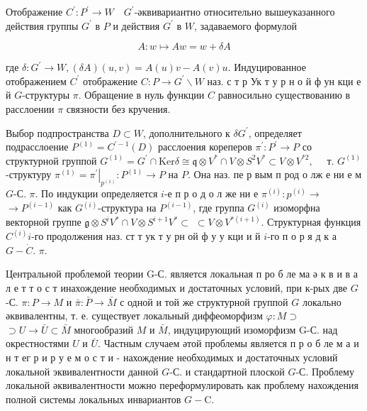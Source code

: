 \documentclass[10pt]{article}
\begin{document}
Отображение $C^{\prime}: P^{\prime} \rightarrow W \quad G^{\prime}$-әквивариантно относительно вышеуказанного действия группы $G^{\prime}$ в $P$ и действия $G^{\prime}$ в $W$, задаваемого формулой



\[

A: w \longmapsto A w=w+\delta A

\]



где $\delta: G^{\prime} \rightarrow W,(\delta A)(u, v)=A(u) v-A(v) u$. Индуцированное отображением $C^{\prime}$ отображение $C: P \rightarrow G^{\prime} \backslash W$ наз. с т р Ук т у р н о й ф ун кци е й $G$-структуры $\pi$. Обращение в нуль функции $C$ равносильно существованию в расслоении $\pi$ связности без кручения.



Выбор подпространства $D \subset W$, дополнительного к $\delta G^{\prime}$, определяет подрасслоение $P^{(1)}=C^{\prime-1}(D)$ расслоения кореперов $\pi^{\prime}: P^{\prime} \rightarrow P$ со структурной группой $G^{(1)}=G^{\prime} \cap \mathrm{Ker} \delta \cong \mathfrak{q} \otimes V^{*} \cap V \otimes S^{2} V^{*} \subset V \otimes V^{* 2}, \quad$ т. $G^{(1)}$-структуру $\pi^{(1)}=\left.\pi^{\prime}\right|_{p^{(1)}}: P^{(1)} \rightarrow P$ на $P$. Она наз. пе р вым п род о лж е ни е м $G$-С. $\pi$. По индукции определяется $i$-е п р о д о л же ни е $\pi^{(i)}: p^{(i)} \rightarrow$ $\rightarrow P^{(i-1)}$ как $G^{(i)}$-структура на $P^{(i-1)}$, где группа $G^{(i)}$ изоморфна векторной группе $\mathfrak{g} \otimes S^{i} V^{*} \cap V \otimes S^{i+1} V^{*} \subset$ $\subset V \otimes V^{*(i+1)}$. Структурная функция $C^{(i)} i$-го продолжения наз. ст т ук т у рн ой ф у у кци и й $i$-го п о р я д к а $G-\dot{C}$. $\pi$.



Центральной проблемой теории G-С. является локальная п ро б ле ма ә к в и в а л е т т о с т инахождение необходимых и достаточных условий, при к-рых две $G$-С. $\pi: P \rightarrow M$ и $\bar{\pi}: \bar{P} \rightarrow \bar{M}$ с одной и той же структурной группой $G$ локально әквивалентны, т. е. существует локальный диффеоморфизм $\varphi: M \supset$ $\supset U \rightarrow \bar{U} \subset \bar{M}$ многообразий $M$ и $\bar{M}$, индуцирующий изоморфизм G-С. над окрестностями $U$ и $\bar{U}$. Частным случаем әтой проблемы является п р о б ле м а и н т ег р и р у е м о с т и - нахождение необходимых и достаточных условий локальной эквивалентности данной $G$-С. и стандартной плоской $G$-С. Проблему локальной әквивалентности можно переформулировать как проблему нахождения полной системы локальных инвариантов $G-\mathrm{C}$.
\end{document}
